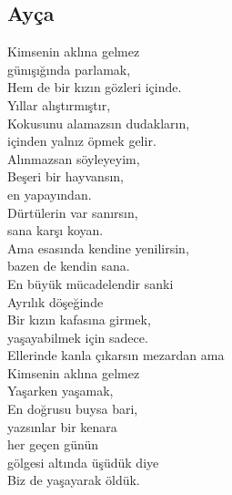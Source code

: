 \subsection{Ayça}

Kimsenin aklına gelmez \\
günışığında parlamak, \\
Hem de bir kızın gözleri içinde. \\

\noindent\newline
Yıllar alıştırmıştır, \\
Kokusunu alamazsın dudakların, \\
içinden yalnız öpmek gelir. \\

\noindent\newline
Alınmazsan söyleyeyim, \\
Beşeri bir hayvansın, \\
en yapayından. \\

\noindent\newline
Dürtülerin var sanırsın, \\
sana karşı koyan. \\
Ama esasında kendine yenilirsin, \\
bazen de kendin sana. \\

\noindent\newline
En büyük mücadelendir sanki \\
Ayrılık döşeğinde \\
Bir kızın kafasına girmek, \\
yaşayabilmek için sadece. \\

\noindent\newline
Ellerinde kanla çıkarsın mezardan ama \\
Kimsenin aklına gelmez \\
Yaşarken yaşamak, \\
En doğrusu buysa bari, \\
yazsınlar bir kenara \\
her geçen günün \\
gölgesi altında üşüdük diye \\
Biz de yaşayarak öldük. \\